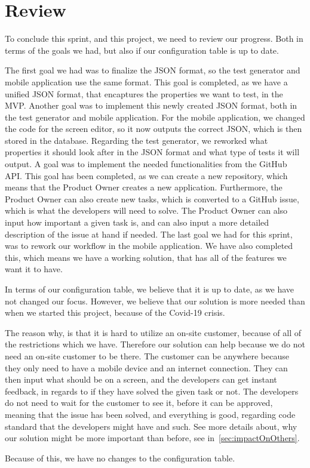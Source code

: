 \section{Review}
To conclude this sprint, and this project, we need to review our progress.
Both in terms of the goals we had, but also if our configuration table is up to date.

The first goal we had was to finalize the JSON format, so the test generator and mobile application use the same format.
This goal is completed, as we have a unified JSON format, that encaptures the properties we want to test, in the MVP.
Another goal was to implement this newly created JSON format, both in the test generator and mobile application.
For the mobile application, we changed the code for the screen editor, so it now outputs the correct JSON, which is then stored in the database.
Regarding the test generator, we reworked what properties it should look after in the JSON format and what type of tests it will output.
A goal was to implement the needed functionalities from the GitHub API.
This goal has been completed, as we can create a new repository, which means that the Product Owner creates a new application.
Furthermore, the Product Owner can also create new tasks, which is converted to a GitHub issue, which is what the developers will need to solve.
The Product Owner can also input how important a given task is, and can also input a more detailed description of the issue at hand if needed.
The last goal we had for this sprint, was to rework our workflow in the mobile application.
We have also completed this, which means we have a working solution, that has all of the features we want it to have.

In terms of our configuration table, we believe that it is up to date, as we have not changed our focus.
However, we believe that our solution is more needed than when we started this project, because of the Covid-19 crisis.

The reason why, is that it is hard to utilize an on-site customer, because of all of the restrictions which we have.
Therefore our solution can help because we do not need an on-site customer to be there.
The customer can be anywhere because they only need to have a mobile device and an internet connection.
They can then input what should be on a screen, and the developers can get instant feedback, in regards to if they have solved the given task or not.
The developers do not need to wait for the customer to see it, before it can be approved, meaning that the issue has been solved, and everything is good, regarding code standard that the developers might have and such.
See more details about, why our solution might be more important than before, see in~\autoref{sec:impactOnOthers}.

Because of this, we have no changes to the configuration table.